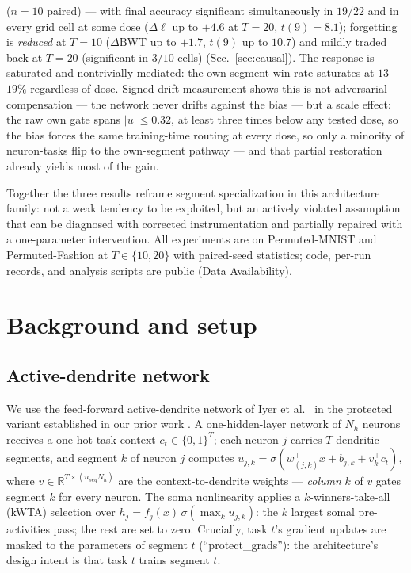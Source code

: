\documentclass[review,12pt,number]{elsarticle}
\begin{document}
\begin{enumerate}
      ($n{=}10$ paired) --- with final accuracy significant simultaneously
      in $19/22$ and in every grid cell at some dose ($\Delta\ell$ up to
      $+4.6$ at $T{=}20$, $t(9){=}8.1$); forgetting is \emph{reduced} at
      $T{=}10$ ($\Delta\mathrm{BWT}$ up to $+1.7$, $t(9)$ up to $10.7$) and
      mildly traded back at $T{=}20$ (significant in $3/10$ cells)
      (Sec.~\ref{sec:causal}). The response is
      saturated and nontrivially mediated: the own-segment win rate
      saturates at $13$--$19\%$ regardless of dose. Signed-drift
      measurement shows this is not adversarial compensation --- the
      network never drifts against the bias --- but a scale effect: the
      raw own gate spans $|u| \le 0.32$, at least three times below any
      tested dose, so the bias forces the same training-time routing at
      every dose, so only a minority of neuron-tasks
      flip to the own-segment pathway --- and that partial restoration
      already yields most of the gain.
\end{enumerate}

Together the three results reframe segment specialization in this
architecture family: not a weak tendency to be exploited, but an
actively violated assumption that can be diagnosed with corrected
instrumentation and partially repaired with a one-parameter intervention.
All experiments are on Permuted-MNIST and Permuted-Fashion at
$T\in\{10,20\}$ with paired-seed statistics; code, per-run records, and
analysis scripts are public (Data Availability).

\section{Background and setup}
\label{sec:setup}

\subsection{Active-dendrite network}
\label{sec:adnet}

We use the feed-forward active-dendrite network of Iyer et al.\
\cite{iyer2022} in the protected variant established in our prior work
\cite{zhou2026delp}. A one-hidden-layer network of $N_h$ neurons receives a
one-hot task context $c_t \in \{0,1\}^{T}$; each neuron $j$ carries $T$
dendritic segments, and segment $k$ of neuron $j$ computes
$u_{j,k} = \sigma(w_{(j,k)}^\top x + b_{j,k} + v_{k}^\top c_t)$, where
$v \in \mathbb{R}^{T \times (n_{seg} N_h)}$ are the context-to-dendrite
weights --- \emph{column} $k$ of $v$ gates segment $k$ for every neuron.
The soma nonlinearity applies a $k$-winners-take-all (kWTA) selection over
$h_j = f_j(x)\, \sigma(\max_k u_{j,k})$: the $k$ largest somal pre-activities
pass; the rest are set to zero. Crucially, task $t$'s gradient updates are
masked to the parameters of segment $t$ (``protect\_grads''): the
architecture's design intent is that task $t$ trains segment $t$.
\end{document}
